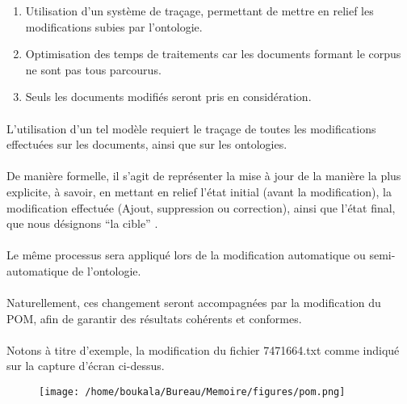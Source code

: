 \documentclass[12pt, a4paper, oneside]{book}
\begin{document}
\begin{enumerate}
\item Utilisation d'un système de traçage, permettant de mettre en relief les modifications subies par l'ontologie.\\
\item Optimisation des temps de traitements car les documents formant le corpus ne sont pas tous parcourus.\\ \item Seuls les documents modifiés seront pris en considération.\\
\end{enumerate}
\paragraph{}
L'utilisation d'un tel modèle requiert le traçage de toutes les modifications effectuées sur les documents, ainsi que sur les ontologies.
\paragraph{}
De manière formelle, il s'agit de représenter la mise à jour de la manière la plus explicite, à savoir, en mettant en relief l'état initial (avant la modification), la modification effectuée (Ajout, suppression ou correction), ainsi que l'état final, que nous désignons “la cible” \citep{discovery}.
\paragraph{}
Le même processus sera appliqué lors de la modification automatique ou semi-automatique de l'ontologie.
\paragraph{}
Naturellement, ces changement seront accompagnées par la modification du POM, afin de garantir des résultats cohérents et conformes.

\paragraph{}
Notons à titre d'exemple, la modification du fichier 7471664.txt comme indiqué sur la capture d'écran ci-dessus.\\


\begin{figure}[h!]
\begin{center}
\texttt{[image: /home/boukala/Bureau/Memoire/figures/pom.png]}
\end{center}
\end{figure}
\end{document}
